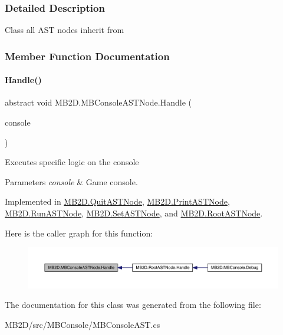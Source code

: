 \subsubsection{Detailed Description}
Class all A\+ST nodes inherit from 



\subsubsection{Member Function Documentation}
\hypertarget{class_m_b2_d_1_1_m_b_console_a_s_t_node_aa70a49e61ab623698af4ed8fda4ebbf5}{}\label{class_m_b2_d_1_1_m_b_console_a_s_t_node_aa70a49e61ab623698af4ed8fda4ebbf5} 
\paragraph{\texorpdfstring{Handle()}{Handle()}}
{\footnotesize\ttfamily abstract void M\+B2\+D.\+M\+B\+Console\+A\+S\+T\+Node.\+Handle (\begin{DoxyParamCaption}\item[{\hyperlink{class_m_b2_d_1_1_m_b_console}{M\+B\+Console}}]{console }\end{DoxyParamCaption})\hspace{0.3cm}{\ttfamily [pure virtual]}}



Executes specific logic on the console 


\begin{DoxyParams}{Parameters}
{\em console} & Game console.\\
\hline
\end{DoxyParams}


Implemented in \hyperlink{class_m_b2_d_1_1_quit_a_s_t_node_a42a27d409a04151393bedcfff8ca5a3c}{M\+B2\+D.\+Quit\+A\+S\+T\+Node}, \hyperlink{class_m_b2_d_1_1_print_a_s_t_node_a61d2408e999df07c1190f6ba8bb6ad3f}{M\+B2\+D.\+Print\+A\+S\+T\+Node}, \hyperlink{class_m_b2_d_1_1_run_a_s_t_node_a20845d86608c81357f4347c29dcaf2c8}{M\+B2\+D.\+Run\+A\+S\+T\+Node}, \hyperlink{class_m_b2_d_1_1_set_a_s_t_node_a54eba248a545f6182c6a5509c4c1a6f2}{M\+B2\+D.\+Set\+A\+S\+T\+Node}, and \hyperlink{class_m_b2_d_1_1_root_a_s_t_node_a16290285c34db0660c0a8006fa182d0d}{M\+B2\+D.\+Root\+A\+S\+T\+Node}.

Here is the caller graph for this function\+:
\nopagebreak
\begin{figure}[H]
\begin{center}
\leavevmode
\includegraphics[width=350pt]{class_m_b2_d_1_1_m_b_console_a_s_t_node_aa70a49e61ab623698af4ed8fda4ebbf5_icgraph}
\end{center}
\end{figure}


The documentation for this class was generated from the following file\+:\begin{DoxyCompactItemize}
\item 
M\+B2\+D/src/\+M\+B\+Console/M\+B\+Console\+A\+S\+T.\+cs\end{DoxyCompactItemize}
